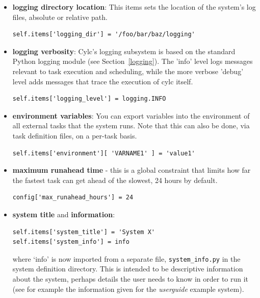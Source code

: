 \documentclass[11pt,a4paper]{article}
\begin{document}
\begin{itemize}
    \item {\bf logging directory location}: 
        This items sets the location of the system's log files, absolute
        or relative path.

        \begin{lstlisting}
self.items['logging_dir'] = '/foo/bar/baz/logging'
        \end{lstlisting}

    \item {\bf logging verbosity}: Cylc's logging subsystem is based on
        the standard Python logging module (see
        Section~\ref{logging}). The 'info' level logs messages
        relevant to task execution and scheduling, while the more
        verbose 'debug' level adds messages that trace the execution of
        cylc itself.

        \begin{lstlisting}
self.items['logging_level'] = logging.INFO
        \end{lstlisting}

    \item {\bf environment variables}: You can export variables into the 
        environment of all external tasks that the system runs. Note that
        this can also be done, via task definition files, on a per-task
        basis.

        \begin{lstlisting}
self.items['environment'][ 'VARNAME1' ] = 'value1'
        \end{lstlisting}

    \item {\bf maximum runahead time} - this is a global constraint that
        limits how far the fastest task can get ahead of the slowest, 24
        hours by default.
        
        \begin{lstlisting}
config['max_runahead_hours'] = 24
        \end{lstlisting}


    \item {\bf system title} and {\bf information}: 

        \begin{lstlisting}
self.items['system_title'] = 'System X'
self.items['system_info'] = info
        \end{lstlisting}
        where `info' is now imported from a separate file, 
        \lstinline=system_info.py= in the system definition directory.
        This is intended to be descriptive information about the system,
        perhaps details the user needs to know in order to run it (see
        for example the information given for the {\em userguide}
        example system).


\end{itemize}
\end{document}
